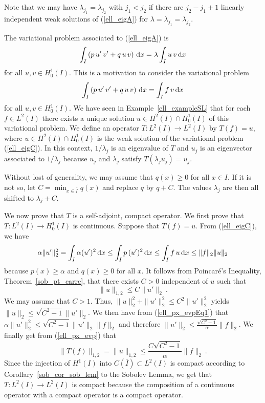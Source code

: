 \begin{egg}
Note that we may have $\lambda_{j_1} = \lambda_{j_2}$ with $j_1 < j_2$
if there are $j_2 -j_1 + 1$ linearly independent weak solutions of
(\ref{ell_eigA}) for $\lambda = \lambda_{j_1} = \lambda_{j_2}$.

The variational problem associated to (\ref{ell_eigA}) is
\begin{equation} \label{ell_eigB}
\int_I \left( p\, u'\, v'+ q\, u\, v \right) \,\mathrm{d}{x} =
\lambda \int_I u\, v \,\mathrm{d}{x}
\end{equation}
for all $\displaystyle u,v \in H_0^1(I)$.
This is a motivation to consider the variational problem
\begin{equation} \label{ell_eigC}
\int_I \left( p\, u'\, v' + q\, u\, v \right) \,\mathrm{d}{x} = \int_I f\, v \,\mathrm{d}{x}
\end{equation}
for all $\displaystyle u,v \in H_0^1(I)$.
We have seen in Example~\ref{ell_exampleSL} that for each
$\displaystyle f \in L^2(I)$ there
exists a unique solution $\displaystyle u \in H^2(I) \cap H^1_0(I)$ of this
variational problem.  We define an operator $\displaystyle T:L^2(I) \to L^2(I)$
by $T(f) = u$, where $\displaystyle u \in H^2(I) \cap H^1_0(I)$ is the
weak solution of the variational problem (\ref{ell_eigC}).  In this context,
$1/\lambda_j$ is an eigenvalue of $T$ and $u_j$ is an eigenvector
associated to $1/\lambda_j$ because $u_j$ and $\lambda_j$ satisfy
$T(\lambda_j u_j) = u_j$.

Without lost of generality, we may assume that $q(x)\geq 0$ for all
$x \in I$.  If it is not so, let
$\displaystyle C = \min_{x\in\overline{I}} q(x)$
and replace $q$ by $q + C$.  The values $\lambda_j$ are then all
shifted to $\lambda_j + C$.

We now prove that $T$ is a self-adjoint, compact operator.  We first
prove that $\displaystyle T:L^2(I) \to H_0^1(I)$ is continuous.  Suppose that
$T(f) =u$.  From (\ref{ell_eigC}), we have
\begin{equation} \label{ell_px_evpEq1}
\alpha \|u'\|_2^2 = \int_I \alpha (u')^2 \,\mathrm{d}{x}
\leq \int_I p\, (u')^2 \,\mathrm{d}{x} \leq \int_I f \, u \,\mathrm{d}{x}
\leq \|f\|_2 \|u\|_2
\end{equation}
because $p(x)\geq \alpha$ and $q(x) \geq 0$ for all $x$.
It follows from Poincar\'e's Inequality, Theorem~\ref{sob_pt_carre},
that there exists $C>0$ independent of $u$ such that
\begin{equation} \label{ell_px_evp}
\| u \|_{1,2} \leq C \|u'\|_2 \ .
\end{equation}
We may assume that $C>1$.  Thus,
$\displaystyle \|u\|_2^2 + \|u'\|_2^2 \leq C^2 \|u'\|_2^2$ yields
$\displaystyle \|u \|_2 \leq \sqrt{C^2-1} \|u'\|_2$.
We then have from (\ref{ell_px_evpEq1}) that
$\displaystyle \alpha \|u'\|_2^2 \leq \sqrt{C^2-1} \|u'\|_2 \|f\|_2$
and therefore
$\displaystyle \|u'\|_2 \leq \frac{\sqrt{C^2-1}}{\alpha} \|f\|_2$.
We finally get from (\ref{ell_px_evp}) that
\[
\|T(f)\|_{1,2} = \|u\|_{1,2} \leq \frac{C\sqrt{C^2-1}}{\alpha}
\|f\|_2 \ .
\]
Since the injection of $\displaystyle H^1(I)$ into
$C(\overline{I}) \subset L^2(I)$
is compact according to Corollary~\ref{sob_cor_sob_lem} to the Sobolev Lemma,
we get that $\displaystyle T:L^2(I) \to L^2(I)$ is compact because the
composition of a continuous operator with a compact operator is a
compact operator.


\end{egg}

